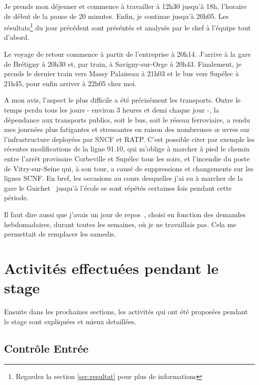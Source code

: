 \documentclass{article}
\begin{document}
\vspace{12pt}

Je prends mon déjeuner et commence à travailler à 12h30 jusqu'à 18h, l'horaire
de début de la pause de 20 minutes. Enfin, je continue jusqu'à 20h05. Les
résultats\footnote{Regardez la section \ref{sec:resultat} pour plus de
informations} du jour précédent sont préséntés et analysés par le chef à
l'équipe tout d'abord.

\vspace{12pt}

Le voyage de retour commence à partir de l'entreprise à 20h14. J'arrive à la
gare de Brétigny à 20h30 et, par train, à Savigny-sur-Orge à 20h43. Finalement,
je prends le dernier train vers Massy Palaiseau à 21h03 et le bus vers Supélec
à 21h45, pour enfin arriver à 22h05 chez moi.

\vspace{12pt}

A mon avis, l'aspect le plus difficile a été précisément les transports. Outre
le temps perdu tous les jours - environ 3 heures et demi chaque jour -, la
dépendance aux transports publics, soit le bus, soit le réseau ferroviaire, a
rendu mes journées plus fatigantes et stressantes en raison des nombreuses \oe
uvres sur l'infrastructure deployées par SNCF et RATP. C'est possible citer par
exemple les récentes modifications de la ligne 91.10, qui m'oblige à marcher à
pied le chemin entre l'arrêt provisoire Corbeville et Supélec tous les soirs,
et l'incendie du poste de Vitry-sur-Seine qui, à son tour, a causé de
suppressions et changements sur les lignes SCNF. En bref, les occasions au cours
desquelles j'ai eu à marcher de la gare \og le Guichet\fg~ jusqu'à
l'école se sont répétés certaines fois pendant cette période.

\vspace{12pt}

Il faut dire aussi que j'avais un \og jour de repos\fg~, choisi
en fonction des demandes hebdomadaires, durant toutes les semaines, où je ne
travaillais pas. Cela me permettait de remplacer les samedis.


\section{Activités effectuées pendant le stage}

Ensuite dans les prochaines sections, les activités qui ont été proposées
pendant le stage sont expliquées et mieux detaillées.

\subsection{Contrôle Entrée}
\end{document}
